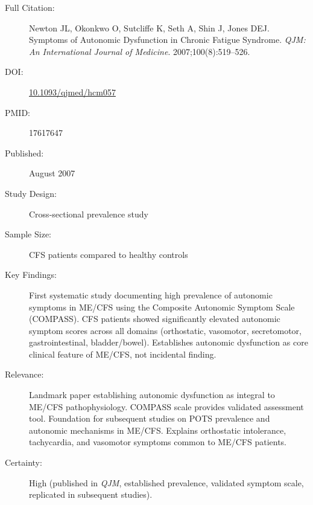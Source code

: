 \begin{description}
    \item[Full Citation:] Newton JL, Okonkwo O, Sutcliffe K, Seth A, Shin J, Jones DEJ. Symptoms of Autonomic Dysfunction in Chronic Fatigue Syndrome. \textit{QJM: An International Journal of Medicine}. 2007;100(8):519--526.
    \item[DOI:] \href{https://doi.org/10.1093/qjmed/hcm057}{10.1093/qjmed/hcm057}
    \item[PMID:] 17617647
    \item[Published:] August 2007
    \item[Study Design:] Cross-sectional prevalence study
    \item[Sample Size:] CFS patients compared to healthy controls
    \item[Key Findings:] First systematic study documenting high prevalence of autonomic symptoms in ME/CFS using the Composite Autonomic Symptom Scale (COMPASS). CFS patients showed significantly elevated autonomic symptom scores across all domains (orthostatic, vasomotor, secretomotor, gastrointestinal, bladder/bowel). Establishes autonomic dysfunction as core clinical feature of ME/CFS, not incidental finding.
    \item[Relevance:] Landmark paper establishing autonomic dysfunction as integral to ME/CFS pathophysiology. COMPASS scale provides validated assessment tool. Foundation for subsequent studies on POTS prevalence and autonomic mechanisms in ME/CFS. Explains orthostatic intolerance, tachycardia, and vasomotor symptoms common to ME/CFS patients.
    \item[Certainty:] High (published in \textit{QJM}, established prevalence, validated symptom scale, replicated in subsequent studies).
\end{description}

